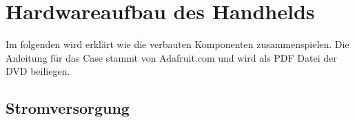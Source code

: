 %
%

\chapter{Hardwareaufbau des Handhelds}

Im folgenden wird erklärt wie die verbauten Komponenten zusammenspielen. Die Anleitung für das Case stammt von Adafruit.com und wird als PDF Datei der DVD beiliegen. 

\section{Stromversorgung}




